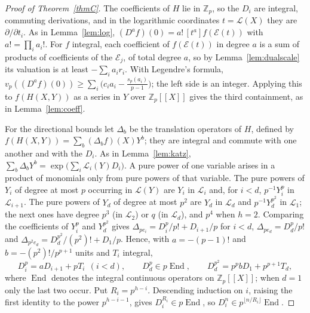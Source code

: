 \documentclass[11pt]{amsart}
\theoremstyle{definition}
\theoremstyle{remark}
\newcommand{\Z}{\mathbb Z}
\newcommand{\vp}{v_p}
\DeclareMathOperator{\End}{End}
\begin{document}
\begin{proof}[Proof of Theorem~\ref{thmC}]
The coefficients of $H$ lie in $\Z_p$, so the $D_i$ are integral, commuting derivations, and in the logarithmic coordinates $t=\mathcal L(X)$ they are $\partial/\partial t_i$. As in Lemma~\ref{lem:log}, $(D^af)(0)=a!\,[t^a]f(\mathcal E(t))$ with $a!=\prod_ia_i!$. For $f$ integral, each coefficient of $f(\mathcal E(t))$ in degree $a$ is a sum of products of coefficients of the $\mathcal E_j$, of total degree $a$, so by Lemma~\ref{lem:dualscale} its valuation is at least $-\sum_ia_ir_i$. With Legendre's formula, $\vp((D^af)(0))\ge\sum_i\bigl(c_ia_i-\frac{s_p(a_i)}{p-1}\bigr)$; the left side is an integer. Applying this to $f(H(X,Y))$ as a series in $Y$ over $\Z_p[[X]]$ gives the third containment, as in Lemma~\ref{lem:coeff}.

For the directional bounds let $\Delta_b$ be the translation operators of $H$, defined by $f(H(X,Y))=\sum_b(\Delta_bf)(X)Y^b$; they are integral and commute with one another and with the $D_i$. As in Lemma~\ref{lem:katz}, $\sum_b\Delta_bY^b=\exp\bigl(\sum_i\mathcal L_i(Y)D_i\bigr)$. A pure power of one variable arises in a product of monomials only from pure powers of that variable. The pure powers of $Y_i$ of degree at most $p$ occurring in $\mathcal L(Y)$ are $Y_i$ in $\mathcal L_i$ and, for $i<d$, $p^{-1}Y_i^p$ in $\mathcal L_{i+1}$. The pure powers of $Y_d$ of degree at most $p^2$ are $Y_d$ in $\mathcal L_d$ and $p^{-1}Y_d^{p^2}$ in $\mathcal L_1$; the next ones have degree $p^3$ (in $\mathcal L_2$) or $q$ (in $\mathcal L_d$), and $p^4$ when $h=2$. Comparing the coefficients of $Y_i^p$ and $Y_d^{p^2}$ gives $\Delta_{pe_i}=D_i^p/p!+D_{i+1}/p$ for $i<d$, $\Delta_{pe_d}=D_d^p/p!$ and $\Delta_{p^2e_d}=D_d^{p^2}/(p^2)!+D_1/p$. Hence, with $a=-(p-1)!$ and $b=-(p^2)!/p^{p+1}$ units and $T_i$ integral,
\begin{equation}\label{eq:duallow}
 D_i^p=aD_{i+1}+pT_i\ \ (i<d),\qquad D_d^p\in p\End,\qquad D_d^{p^2}=p^pbD_1+p^{p+1}T_d,
\end{equation}
where $\End$ denotes the integral continuous operators on $\Z_p[[X]]$; when $d=1$ only the last two occur. Put $R_i=p^{h-i}$. Descending induction on $i$, raising the first identity to the power $p^{h-i-1}$, gives $D_i^{R_i}\in p\End$, so $D_i^n\in p^{\lfloor n/R_i\rfloor}\End$.


\end{proof}
\end{document}
